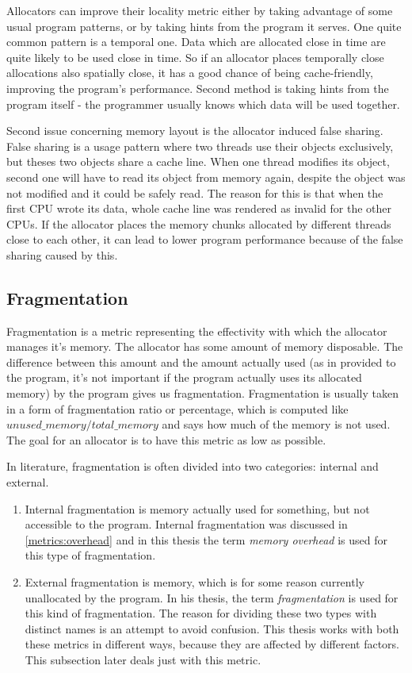 Allocators can improve their locality metric either by taking advantage of some usual program patterns, or by taking hints from the program it serves. One quite common pattern is a temporal one. Data which are allocated close in time are quite likely to be used close in time. So if an allocator places temporally close allocations also spatially close, it has a good chance of being cache-friendly, improving the program's performance. Second method is taking hints from the program itself - the programmer usually knows which data will be used together.

Second issue concerning memory layout is the allocator induced false sharing. False sharing is a usage pattern where two threads use their objects exclusively, but theses two objects share a cache line. When one thread modifies its object, second one will have to read its object from memory again, despite the object was not modified and it could be safely read. The reason for this is that when the first CPU wrote its data, whole cache line was rendered as invalid for the other CPUs. If the allocator places the memory chunks allocated by different threads close to each other, it can lead to lower program performance because of the false sharing caused by this.

\subsection{Fragmentation}
\label{metrics:fragmentation}

Fragmentation is a metric representing the effectivity with which the allocator manages it's memory. The allocator has some amount of memory disposable. The difference between this amount and the amount actually used (as in provided to the program, it's not important if the program actually uses its allocated memory) by the program gives us fragmentation. Fragmentation is usually taken in a form of fragmentation ratio or percentage, which is computed like $unused\_memory / total\_memory$ and says how much of the memory is not used. The goal for an allocator is to have this metric as low as possible.

In literature, fragmentation is often divided into two categories: internal and external.
\begin{enumerate}
\item Internal fragmentation is memory actually used for something, but not accessible to the program. Internal fragmentation was discussed in \ref{metrics:overhead} and in this thesis the term {\em memory overhead} is used for this type of fragmentation.
\item External fragmentation is memory, which is for some reason currently unallocated by the program. In his thesis, the term {\em fragmentation} is used for this kind of fragmentation. The reason for dividing these two types with distinct names is an attempt to avoid confusion. This thesis works with both these metrics in different ways, because they are affected by different factors. This subsection later deals just with this metric.
\end{enumerate}

